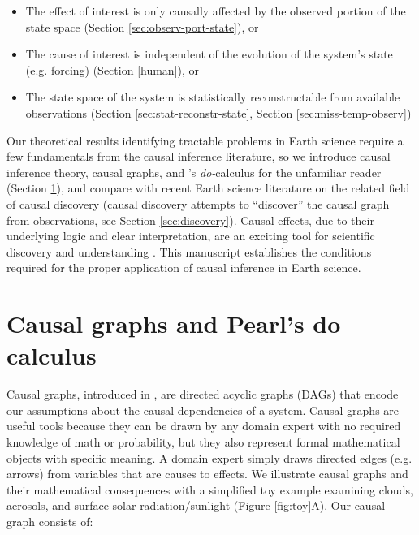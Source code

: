 \documentclass[12pt]{article}
\begin{document}
\begin{itemize}
\item The effect of interest is only causally affected by the observed
  portion of the state space (Section \ref{sec:observ-port-state}), or
\item The cause of interest is independent of the evolution of the
  system's state (e.g. forcing) (Section \ref{human}), or
\item The state space of the system is statistically reconstructable
  from available observations (Section \ref{sec:stat-reconstr-state},
  Section \ref{sec:miss-temp-observ})

\end{itemize}

Our theoretical results identifying tractable problems in Earth
science require a few fundamentals from the causal inference
literature, so we introduce causal inference theory, causal graphs,
and \citet{pearl2009}'s \textit{do-}calculus for the unfamiliar reader
(Section \ref{sec:causal-graphs-pearls}), and compare with recent
Earth science literature on the related field of causal discovery
(causal discovery attempts to ``discover'' the causal graph from
observations, see Section \ref{sec:discovery}). Causal effects, due to
their underlying logic and clear interpretation, are an exciting tool
for scientific discovery and understanding
\citep{hannart-da,naveau-2020}. This manuscript establishes the
conditions required for the proper application of causal inference in
Earth science.


\section{Causal graphs and Pearl's do calculus}
\label{sec:causal-graphs-pearls}

Causal graphs, introduced in \citet{pearl1995causal}, are directed
acyclic graphs (DAGs) that encode our assumptions about the causal
dependencies of a system. Causal graphs are useful tools because they
can be drawn by any domain expert with no required knowledge of math
or probability, but they also represent formal mathematical objects
with specific meaning. A domain expert simply draws directed edges
(e.g. arrows) from variables that are causes to effects. We illustrate
causal graphs and their mathematical consequences with a simplified
toy example examining clouds, aerosols, and surface solar
radiation/sunlight (Figure \ref{fig:toy}A). Our causal graph consists
of:
\end{document}
